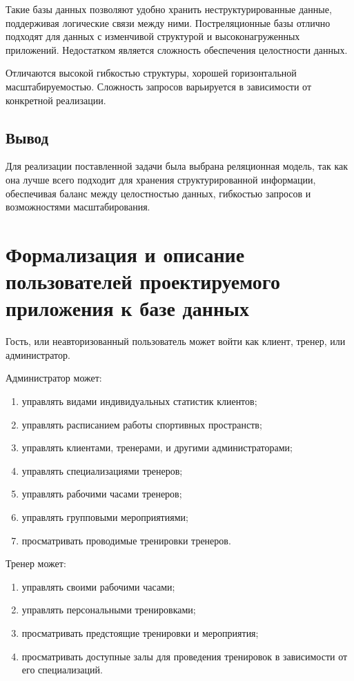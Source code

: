 Такие базы данных позволяют удобно хранить неструктурированные данные, поддерживая логические связи между ними. 
Постреляционные базы отлично подходят для данных с изменчивой структурой и высоконагруженных приложений.
Недостатком является сложность обеспечения целостности данных.

Отличаются высокой гибкостью структуры, хорошей горизонтальной масштабируемостью. 
Сложность запросов варьируется в зависимости от конкретной реализации. 

\subsection{Вывод}

Для реализации поставленной задачи была выбрана реляционная модель, так как она лучше всего подходит для хранения 
структурированной информации, обеспечивая баланс между целостностью данных, гибкостью запросов и возможностями масштабирования.

\section{Формализация и описание пользователей проектируемого приложения к базе данных}

Гость, или неавторизованный пользователь может войти как клиент, тренер, или администратор.

Администратор может:

\begin{enumerate}
	\item управлять видами индивидуальных статистик клиентов;
	\item управлять расписанием работы спортивных пространств;
	\item управлять клиентами, тренерами, и другими администраторами;
	\item управлять специализациями тренеров;
	\item управлять рабочими часами тренеров;
	\item управлять групповыми мероприятиями;
	\item просматривать проводимые тренировки тренеров.
\end{enumerate}

Тренер может:

\begin{enumerate}
	\item управлять своими рабочими часами;
	\item управлять персональными тренировками;
	\item просматривать предстоящие тренировки и мероприятия;
	\item просматривать доступные залы для проведения тренировок в зависимости от его специализаций.
\end{enumerate}

